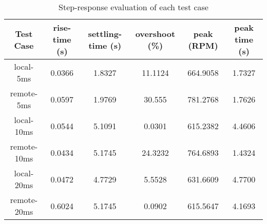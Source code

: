 \begin{table}[htp]
	\centering
	\caption{Step-response evaluation of each test case}
	\label{tab:step-analysis}
	\begin{tabular}{|c|c|c|c|c|c|}
		\hline
		Test Case   & rise-time (s) & settling-time (s) & overshoot (\%) & peak (RPM) & peak time (s) \\
		\hline
		local-5ms   & 0.0366 & 1.8327 & 11.1124 & 664.9058 & 1.7327 \\
		\hline
		remote-5ms  & 0.0597 & 1.9769 & 30.555 & 781.2768 & 1.7626 \\
		\hline
		local-10ms  & 0.0544 & 5.1091 & 0.0301 & 615.2382 & 4.4606 \\
		\hline
		remote-10ms & 0.0434 & 5.1745 & 24.3232 & 764.6893 & 1.4324 \\
		\hline
		local-20ms  & 0.0472 & 4.7729 & 5.5528 & 631.6609 & 4.7700 \\
		\hline
		remote-20ms & 0.6024 & 5.1745 & 0.0902 & 615.5647 & 4.1693 \\
		\hline
	\end{tabular}
\end{table}


